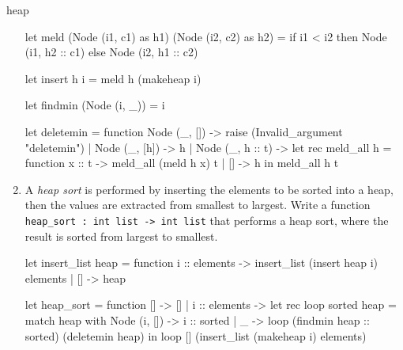 \begin{exercise}{heap}
\begin{enumerate}
\begin{answer}
\begin{ocaml}
let meld (Node (i1, c1) as h1) (Node (i2, c2) as h2) =
   if i1 < i2 then
      Node (i1, h2 :: c1)
   else
      Node (i2, h1 :: c2)

let insert h i =
   meld h (makeheap i)

let findmin (Node (i, _)) =
   i

let deletemin = function
   Node (_, []) -> raise (Invalid_argument "deletemin")
 | Node (_, [h]) -> h
 | Node (_, h :: t) ->
     let rec meld_all h = function
        x :: t -> meld_all (meld h x) t
      | [] -> h
     in
        meld_all h t
\end{ocaml}
\fi\end{answer}

\item A \emph{heap sort} is performed by inserting the elements to be sorted into a heap,
then the values are extracted from smallest to largest.  Write a function
\hbox{\lstinline/heap_sort : int list -> int list/} that performs a heap sort,
where the result is sorted from largest to smallest.

\begin{answer}\ifanswers
\begin{ocaml}
let insert_list heap = function
   i :: elements -> insert_list (insert heap i) elements
 | [] -> heap

let heap_sort = function
   [] -> []
 | i :: elements ->
     let rec loop sorted heap =
        match heap with
           Node (i, []) -> i :: sorted
         | _ -> loop (findmin heap :: sorted) (deletemin heap)
     in
        loop [] (insert_list (makeheap i) elements)
\end{ocaml}
\fi\end{answer}
\end{enumerate}
\end{exercise}

